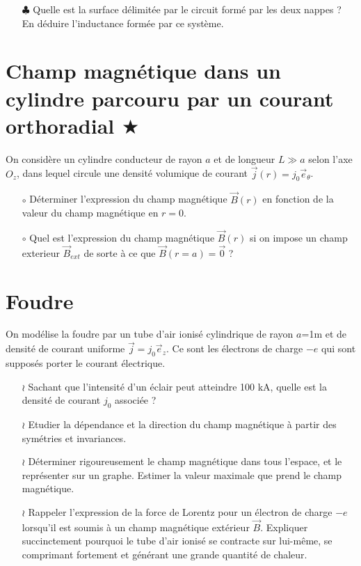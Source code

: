\documentclass{report}
\begin{document}
\begin{itemize}

	\item[$\clubsuit$] Quelle est la surface délimitée par le circuit formé par les deux nappes ? En déduire l'inductance formée par ce système. 
	
\end{itemize}

\newpage

\section*{Champ magnétique dans un cylindre parcouru par un courant orthoradial $\bigstar$}

On considère un cylindre conducteur de rayon $a$ et de longueur $L\gg a$ selon l'axe $O_z$, dans lequel circule une densité volumique de courant $\vec{j}(r)=j_0\vec{e}_\theta$.

\begin{itemize}

	\item[$\circ$] Déterminer l'expression du champ magnétique $\vec{B}(r)$ en fonction de la valeur du champ magnétique en $r=0$.
	\item[$\circ$] Quel est l'expression du champ magnétique $\vec{B}(r)$ si on impose un champ exterieur $\vec{B}_{ext}$ de sorte à ce que  $\vec{B}(r=a)=\vec{0}$ ?

\end{itemize}

\newpage

\section*{Foudre}

On modélise la foudre par un tube d'air ionisé cylindrique de rayon $a$=1m et de densité de courant uniforme $\vec{j}=j_0\vec{e}_z$. Ce sont les électrons de charge $-e$ qui sont supposés porter le courant électrique.

\begin{itemize}

	\item[$\wr$] Sachant que l'intensité d'un éclair peut atteindre 100 kA, quelle est la densité de courant $j_0$ associée ? 

	\item[$\wr$] Etudier la dépendance et la direction du champ magnétique à partir des symétries et invariances.
	
	\item[$\wr$] Déterminer rigoureusement le champ magnétique dans tous l'espace, et le représenter sur un graphe. Estimer la valeur maximale que prend le champ magnétique.
	
	\item[$\wr$] Rappeler l'expression de la force de Lorentz pour un électron de charge $-e$ lorsqu'il est soumis à un champ magnétique extérieur $\vec{B}$. Expliquer succinctement pourquoi le tube d'air ionisé se contracte sur lui-même, se comprimant fortement et générant une grande quantité de chaleur. 

\end{itemize}
\end{document}
